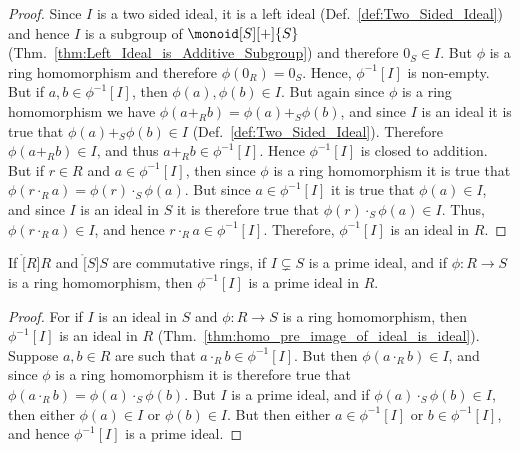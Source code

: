     \begin{proof}
        Since $I$ is a two sided ideal, it is a left ideal
        (Def.~\ref{def:Two_Sided_Ideal}) and hence $I$ is a subgroup of
        $\monoid[S][+]{S}$
        (Thm.~\ref{thm:Left_Ideal_is_Additive_Subgroup}) and therefore
        $0_{S}\in{I}$. But $\phi$ is a ring homomorphism and therefore
        $\phi(0_{R})=0_{S}$. Hence, $\phi^{\minus{1}}[I]$ is non-empty. But
        if $a,b\in\phi^{\minus{1}}[I]$, then $\phi(a),\phi(b)\in{I}$. But
        again since $\phi$ is a ring homomorphism we have
        $\phi(a+_{R}b)=\phi(a)+_{S}\phi(b)$, and since $I$ is an ideal it is
        true that $\phi(a)+_{S}\phi(b)\in{I}$
        (Def.~\ref{def:Two_Sided_Ideal}). Therefore $\phi(a+_{R}b)\in{I}$,
        and thus $a+_{R}b\in\phi^{\minus{1}}[I]$. Hence
        $\phi^{\minus{1}}[I]$ is closed to addition. But if $r\in{R}$ and
        $a\in\phi^{\minus{1}}[I]$, then since $\phi$ is a ring homomorphism
        it is true that $\phi(r\cdot_{R}a)=\phi(r)\cdot_{S}\phi(a)$. But
        since $a\in\phi^{\minus{1}}[I]$ it is true that $\phi(a)\in{I}$, and
        since $I$ is an ideal in $S$ it is therefore true that
        $\phi(r)\cdot_{S}\phi(a)\in{I}$. Thus, $\phi(r\cdot_{R}a)\in{I}$,
        and hence $r\cdot_{R}a\in\phi^{\minus{1}}[I]$. Therefore,
        $\phi^{\minus{1}}[I]$ is an ideal in $R$.
    \end{proof}
    \begin{theorem}
        If $\ring[R]{R}$ and $\ring[S]{S}$ are commutative rings, if
        $I\subsetneq{S}$ is a prime ideal, and if $\phi:R\rightarrow{S}$ is
        a ring homomorphism, then $\phi^{\minus{1}}[I]$ is a prime ideal in
        $R$.
    \end{theorem}
    \begin{proof}
        For if $I$ is an ideal in $S$ and $\phi:R\rightarrow{S}$ is a ring
        homomorphism, then $\phi^{\minus{1}}[I]$ is an ideal in $R$
        (Thm.~\ref{thm:homo_pre_image_of_ideal_is_ideal}). Suppose
        $a,b\in{R}$ are such that $a\cdot_{R}b\in\phi^{\minus{1}}[I]$.
        But then $\phi(a\cdot_{R}b)\in{I}$, and since $\phi$ is a ring
        homomorphism it is therefore true that
        $\phi(a\cdot_{R}b)=\phi(a)\cdot_{S}\phi(b)$. But $I$ is a prime
        ideal, and if $\phi(a)\cdot_{S}\phi(b)\in{I}$, then either
        $\phi(a)\in{I}$ or $\phi(b)\in{I}$. But then either
        $a\in\phi^{\minus{1}}[I]$ or $b\in\phi^{\minus{1}}[I]$, and hence
        $\phi^{\minus{1}}[I]$ is a prime ideal.
    \end{proof}
